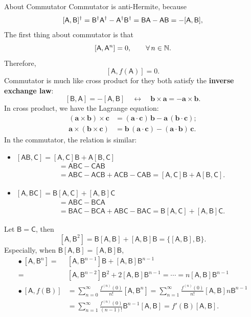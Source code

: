 \documentclass{article}
\newcommand*{\op}[1]{\mathsf{#1}}
\begin{document}
\begin{theorem}{About Commutator}{}
	Commutator is anti-Hermite, because
	$$[\op{A},\op{B}]\adjoint= \op{B}\adjoint\op{A}\adjoint-\op{A}\adjoint\op{B}\adjoint=\op{B}\op{A}-\op{A}\op{B}=-[\op{A},\op{B}],$$
	The first thing about commutator is that
	$$[\op{A},\op{A}^n]=0,\qquad\forall\,n\in\NN.$$
	Therefore, $$[\op{A},f(\op{A})]=0.$$\tcblower
	Commutator is much like cross product for they both satisfy the \textbf{inverse exchange law}:
	$$[\op{B},\op{A}]=-[\op{A},\op{B}]\quad\leftrightarrow\quad\bm b\times\bm a=-\bm a\times\bm b.$$
	In cross product, we have the Lagrange equation:
	\begin{align*}
		(\bm a\times\bm b)\times\bm c & =(\bm a\cdot\bm c)\,\bm b-\bm a\,(\bm b\cdot\bm c); \\
		\bm a\times(\bm b\times\bm c) & =\bm b\,(\bm a\cdot\bm c)-(\bm a\cdot\bm b)\,\bm c.
	\end{align*}
	In the commutator, the relation is similar:
	\begin{itemize}
		\item $[\op{A}\op{B},\op{C}]=[\op{A},\op{C}]\op{B}+\op{A}[\op{B},\op{C}]$
		      \begin{align*}
			      [\op{A}\op{B},\op{C}] & =\op{A}\op{B}\op{C}-\op{C}\op{A}\op{B}                                                        \\
			                       & =\op{A}\op{B}\op{C}-\op{A}\op{C}\op{B}+\op{A}\op{C}\op{B}-\op{C}\op{A}\op{B}=[\op{A},\op{C}]\op{B}+\op{A}[\op{B},\op{C}].
		      \end{align*}
		\item $[\op{A},\op{B}\op{C}]=\op{B}[\op{A},\op{C}]+[\op{A},\op{B}]\op{C}$
		      \begin{align*}
			      [\op{A},\op{B}\op{C}] & =\op{A}\op{B}\op{C}-\op{B}\op{C}\op{A}                                                        \\
			                       & =\op{B}\op{A}\op{C}-\op{B}\op{C}\op{A}+\op{A}\op{B}\op{C}-\op{B}\op{A}\op{C}=\op{B}[\op{A},\op{C}]+[\op{A},\op{B}]\op{C}.
		      \end{align*}
	\end{itemize}
	Let $\op{B}=\op{C}$, then
	$$[\op{A},\op{B}^2]=\op{B}[\op{A},\op{B}]+[\op{A},\op{B}]\op{B}=\bigl\{[\op{A},\op{B}],\op{B}\bigr\}.$$
	Especially, when $\op{B}[\op{A},\op{B}]=[\op{A},\op{B}]\op{B}$,
	\begin{align*}
		\bullet~[\op{A},\op{B}^n]= & [\op{A},\op{B}^{n-1}]\op{B}+[\op{A},\op{B}]\op{B}^{n-1}                                                                        \\
		=                        & [\op{A},\op{B}^{n-2}]\op{B}^2+2[\op{A},\op{B}]\op{B}^{n-1}=\cdots=n[\op{A},\op{B}]\op{B}^{n-1}                                      \\
		\bullet~[\op{A},f(\op{B})] & =\sum_{n=0}^\infty\frac{f^{(n)}(0)}{n!}[\op{A},\op{B}^n]=\sum_{n=1}^\infty\frac{f^{(n)}(0)}{n!}[\op{A},\op{B}]n\op{B}^{n-1} \\
		                         & =\sum_{n=1}^\infty\frac{f^{(n)}(0)}{(n-1)!}\op{B}^{n-1}[\op{A},\op{B}]=f'(\op{B})[\op{A},\op{B}].
	\end{align*}
\end{theorem}
\end{document}
